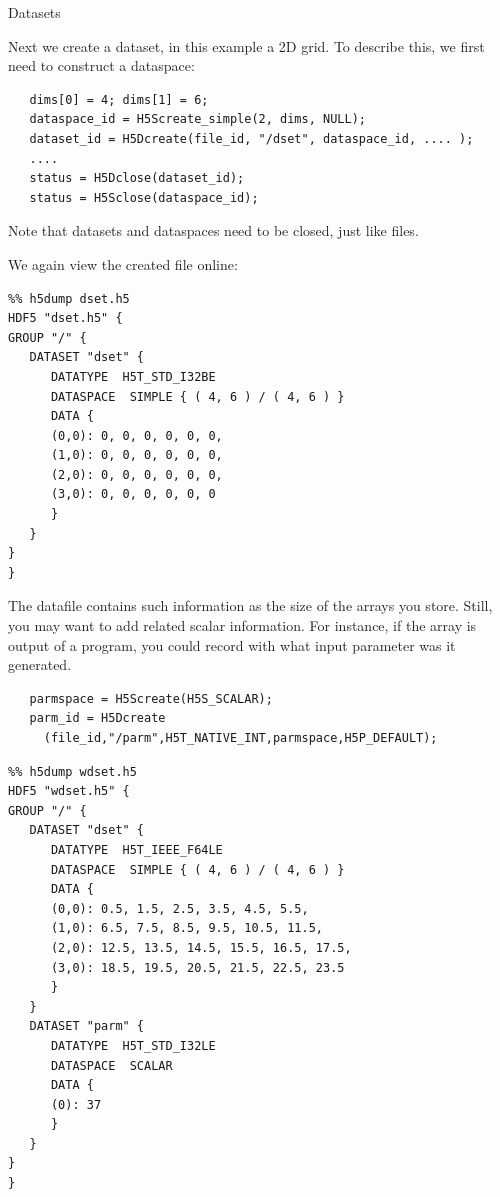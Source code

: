  {Datasets}

Next we create a dataset, in this example a 2D grid. To describe this,
we first need to construct a dataspace:
\begin{verbatim}
   dims[0] = 4; dims[1] = 6; 
   dataspace_id = H5Screate_simple(2, dims, NULL);
   dataset_id = H5Dcreate(file_id, "/dset", dataspace_id, .... );
   ....
   status = H5Dclose(dataset_id);
   status = H5Sclose(dataspace_id);
\end{verbatim}
Note that datasets and dataspaces need to be closed, just like files.



We again view the created file online:
\begin{verbatim}
%% h5dump dset.h5 
HDF5 "dset.h5" {
GROUP "/" {
   DATASET "dset" {
      DATATYPE  H5T_STD_I32BE
      DATASPACE  SIMPLE { ( 4, 6 ) / ( 4, 6 ) }
      DATA {
      (0,0): 0, 0, 0, 0, 0, 0,
      (1,0): 0, 0, 0, 0, 0, 0,
      (2,0): 0, 0, 0, 0, 0, 0,
      (3,0): 0, 0, 0, 0, 0, 0
      }
   }
}
}
\end{verbatim}

The datafile contains such information as the size of the arrays you
store. Still, you may want to add related scalar information. For
instance, if the array is output of a program, you could record
with what input
parameter was it generated.

\begin{verbatim}
   parmspace = H5Screate(H5S_SCALAR);
   parm_id = H5Dcreate
     (file_id,"/parm",H5T_NATIVE_INT,parmspace,H5P_DEFAULT);
\end{verbatim}



\begin{verbatim}
%% h5dump wdset.h5 
HDF5 "wdset.h5" {
GROUP "/" {
   DATASET "dset" {
      DATATYPE  H5T_IEEE_F64LE
      DATASPACE  SIMPLE { ( 4, 6 ) / ( 4, 6 ) }
      DATA {
      (0,0): 0.5, 1.5, 2.5, 3.5, 4.5, 5.5,
      (1,0): 6.5, 7.5, 8.5, 9.5, 10.5, 11.5,
      (2,0): 12.5, 13.5, 14.5, 15.5, 16.5, 17.5,
      (3,0): 18.5, 19.5, 20.5, 21.5, 22.5, 23.5
      }
   }
   DATASET "parm" {
      DATATYPE  H5T_STD_I32LE
      DATASPACE  SCALAR
      DATA {
      (0): 37
      }
   }
}
}
\end{verbatim}

